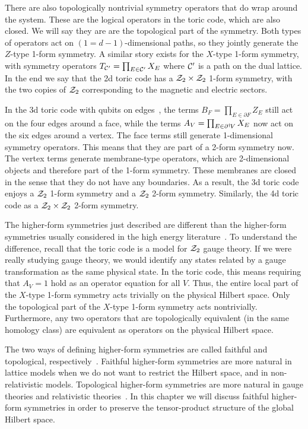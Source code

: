 There are also topologically nontrivial symmetry operators that do wrap around the system. These are the logical operators in the toric code, which are also closed. We will say they are are the topological part of the symmetry. Both types of operators act on $(1=d-1)$-dimensional paths, so they jointly generate the $Z$-type 1-form symmetry. A similar story exists for the $X$-type 1-form symmetry, with symmetry operators $T_{\cal C'} = \prod_{E\in \cal C'}X_E$ where $\cal C'$ is a path on the dual lattice. In the end we say that the 2d toric code has a $\Z_2\times\Z_2$ 1-form symmetry, with the two copies of $\Z_2$ corresponding to the magnetic and electric sectors.

In the 3d toric code with qubits on edges~\cite{CastelnovoChamon2008}, the terms $B_F = \prod_{E \in \partial F} Z_E$ still act on the four edges around a face, while the terms $A_V = \prod_{E\in\pardag V} X_E$ now act on the six edges around a vertex.
The face terms still generate 1-dimensional symmetry operators. This means that they are part of a 2-form symmetry now. The vertex terms generate membrane-type operators, which are 2-dimensional objects and therefore part of the 1-form symmetry. These membranes are closed in the sense that they do not have any boundaries. As a result, the 3d toric code enjoys a $\Z_2$ 1-form symmetry and a $\Z_2$ 2-form symmetry. Similarly, the 4d toric code as a $\Z_2\times\Z_2$ 2-form symmetry. 

The higher-form symmetries just described are different than the higher-form symmetries usually considered in the high energy literature~\cite{Seiberg2020Field, Qi2021Exotic}. To understand the difference, recall that the toric code is a model for $\Z_2$ gauge theory. If we were really studying gauge theory, we would identify any states related by a gauge transformation as the same physical state. In the toric code, this means requiring that $A_V=1$ hold as an operator equation for all $V$. Thus, the entire local part of the $X$-type 1-form symmetry acts trivially on the physical Hilbert space. Only the topological part of the $X$-type 1-form symmetry acts nontrivially. Furthermore, any two operators that are topologically equivalent (in the same homology class) are equivalent as operators on the physical Hilbert space.

The two ways of defining higher-form symmetries are called faithful and topological, respectively~\cite{Qi2021Exotic}. Faithful higher-form symmetries are more natural in lattice models when we do not want to restrict the Hilbert space, and in non-relativistic models. Topological higher-form symmetries are more natural in gauge theories and relativistic theories~\cite{Seiberg2020Field}.  In this chapter we will discuss faithful higher-form symmetries in order to preserve the tensor-product structure of the global Hilbert space.

